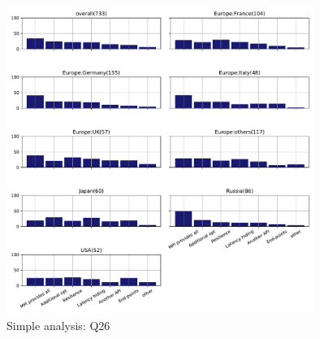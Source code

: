 \begin{figure}[htb]
\begin{center}
\includegraphics[width=10cm]{../pdfs/Q26.pdf}
\caption{Simple analysis: Q26}
\label{fig:Q26}
\end{center}
\end{figure}
